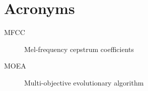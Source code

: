 
\chapter{Acronyms}
\begin{description}
\item[MFCC] Mel-frequency cepstrum coefficients
\item[MOEA] Multi-objective evolutionary algorithm
\end{description}
